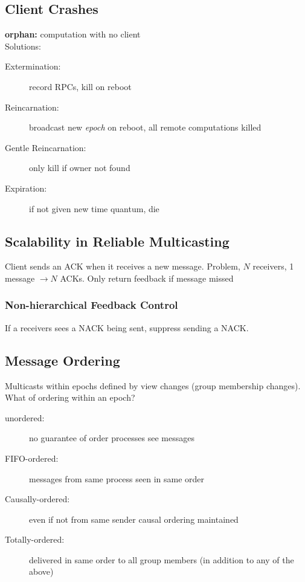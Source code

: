 \subsection{Client Crashes}
\textbf{orphan:} computation with no client\\
Solutions:
\begin{description}
	\item[Extermination:] record RPCs, kill on reboot
	\item[Reincarnation:] broadcast new \textit{epoch} on reboot, all remote computations killed
	\item[Gentle Reincarnation:] only kill if owner not found
	\item[Expiration:] if not given new time quantum, die
\end{description}

\subsection{Scalability in Reliable Multicasting}
Client sends an ACK when it receives a new message. Problem, $N$ receivers, 1 message $\rightarrow N$ ACKs. Only return feedback if message missed

\subsubsection{Non-hierarchical Feedback Control}
If a receivers sees a NACK being sent, suppress sending a NACK.

\subsection{Message Ordering}
Multicasts within epochs defined by view changes (group membership changes). What of ordering within an epoch?
\begin{description}
	\item[unordered:] no guarantee of order processes see messages
	\item[FIFO-ordered:] messages from same process seen in same order
	\item[Causally-ordered:] even if not from same sender causal ordering maintained
	\item[Totally-ordered:] delivered in same order to all group members (in addition to any of the above)
\end{description}


